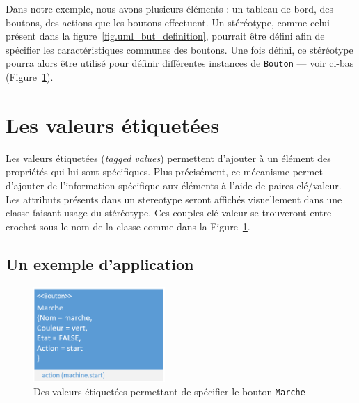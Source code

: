 


Dans notre exemple, nous avons plusieurs éléments : un tableau de bord, des boutons, des actions que les boutons effectuent.
Un stéréotype, comme celui présent dans la figure~\ref{fig.uml_but_definition}, pourrait être d\'efini afin de sp\'ecifier les caractéristiques communes des boutons.
%
Une fois d\'efini, ce st\'er\'eotype pourra alors \^etre utilis\'e pour
d\'efinir diff\'erentes instances de \texttt{Bouton} --- voir ci-bas (Figure~\ref{fig.uml_marche}).



\section{Les valeurs \'etiquet\'ees}

Les valeurs \'etiquet\'ees (\emph{tagged values}) permettent d'ajouter \`a un \'el\'ement des propriétés qui lui sont spécifiques.
Plus pr\'ecis\'ement, ce m\'ecanisme permet d'ajouter de l'information spécifique aux éléments \`a l'aide de paires clé/valeur.
Les attributs présents dans un stereotype seront affichés visuellement dans une classe faisant usage du stéréotype.
Ces couples clé-valeur se trouveront entre crochet sous le nom de la classe comme dans la Figure~\ref{fig.uml_marche}.


\subsection{Un exemple d'application}

\begin{figure}
    \begin{center}
    \includegraphics[width=5cm]{10_img/chap4/start.PNG}
    \caption{Des valeurs \'etiquet\'ees permettant de spécifier le bouton \texttt{Marche}}
    \label{fig.uml_marche}
    \end{center}
\end{figure}

